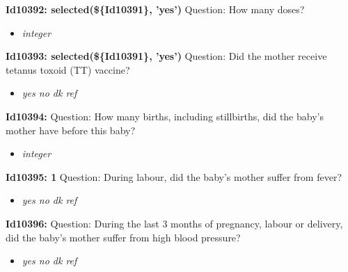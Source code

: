 \documentclass{article}%
\begin{document}
\textbf{Id10392: selected(\$\{Id10391\}, 'yes')\newline%
}%
Question: How many doses?\newline%
%
\begin{itemize}%
\item%
\textit{integer\newline%
}%
\end{itemize}%
\textbf{Id10393: selected(\$\{Id10391\}, 'yes')\newline%
}%
Question: Did the mother receive tetanus toxoid (TT) vaccine?\newline%
%
\begin{itemize}%
\item%
\textit{yes\newline%
 no\newline%
 dk\newline%
 ref\newline%
}%
\end{itemize}%
\textbf{Id10394: \newline%
}%
Question: How many births, including stillbirths, did the baby's mother have before this baby?\newline%
%
\begin{itemize}%
\item%
\textit{integer\newline%
}%
\end{itemize}%
\textbf{Id10395: 1\newline%
}%
Question: During labour, did the baby's mother suffer from fever?\newline%
%
\begin{itemize}%
\item%
\textit{yes\newline%
 no\newline%
 dk\newline%
 ref\newline%
}%
\end{itemize}%
\textbf{Id10396: \newline%
}%
Question: During the last 3 months of pregnancy, labour or delivery, did the baby's mother suffer from high blood pressure?\newline%
%
\begin{itemize}%
\item%
\textit{yes\newline%
 no\newline%
 dk\newline%
 ref\newline%
}%
\end{itemize}%
\end{document}
